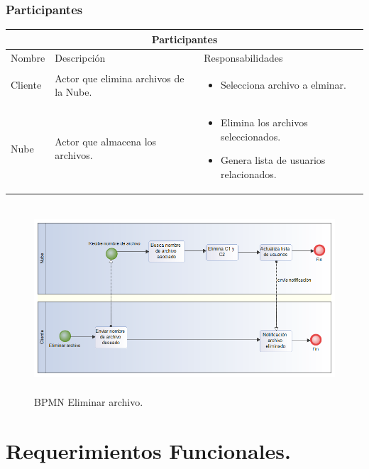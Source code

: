 \subsubsection{Participantes}

\begin{tabular}{ |p{2cm}|p{6cm}|p{6cm}|  }
\hline
\multicolumn{3}{|c|}{  Participantes  } \\
\hline

{ Nombre }  & { Descripción } & { Responsabilidades} \\
\hline
{ Cliente } &   Actor que elimina archivos de la Nube.  &  
			\begin{itemize}	
				\item Selecciona archivo a elminar.
			\end{itemize}   \\ 
\hline
{ Nube } &   Actor que almacena los archivos.  &  
			\begin{itemize}	
				\item Elimina los archivos seleccionados.
				\item Genera lista de usuarios relacionados.
			\end{itemize}   \\ 
\hline
\end{tabular}

\begin{figure}[H]
\centering
	\includegraphics[width=16cm, height=7cm]{./images/BPM_Eliminar.png}
	\caption{BPMN Eliminar archivo.}

\end{figure} 

\newpage

\section{Requerimientos Funcionales. }

